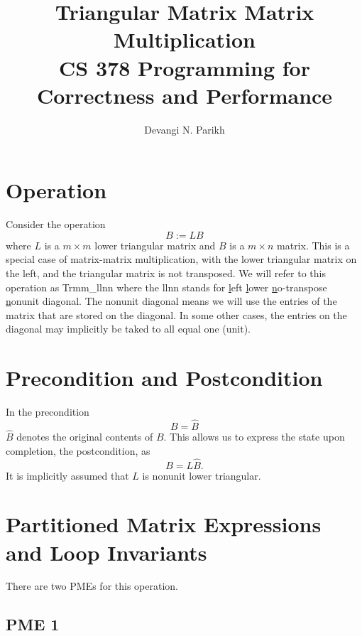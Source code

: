 \documentclass[12pt]{article}
\title{Triangular Matrix Matrix Multiplication \\ CS 378 Programming for Correctness and Performance}
\author{Devangi N. Parikh}
\begin{document}
	\maketitle

\section{Operation}

Consider the operation
\[
B := L B 
\]
where $ L $ is a $ m \times m $ lower triangular matrix and $ B $ is a $ m \times n $ matrix.
This is a special case of  
matrix-matrix multiplication, 
with the {\sc l}ower triangular matrix on the {\sc l}eft, 
and the triangular matrix is {\sc n}ot transposed.
We will refer to this operation
as {\sc Trmm\_llnn} where the {\sc llnn} stands for
\underline{l}eft
\underline{l}ower
\underline{n}o-transpose
\underline{n}onunit diagonal.
The {\sc n}onunit diagonal means we will use the entries of the matrix that are stored on the diagonal.  In some other cases, the entries on the diagonal may implicitly be taked to all equal one ({\sc u}nit).

\section{Precondition and Postcondition}

In the precondition 
\[
B = \widehat B
\]
$ \widehat B $ denotes the original contents of $ B $.
This allows us to express the state upon completion, the postcondition, as
\[
B = L \widehat B.
\]
It is implicitly assumed that $ L $ is nonunit lower triangular.
\section{Partitioned Matrix Expressions and Loop Invariants}

There are two PMEs for this operation.

\subsection{PME 1}
\end{document}
